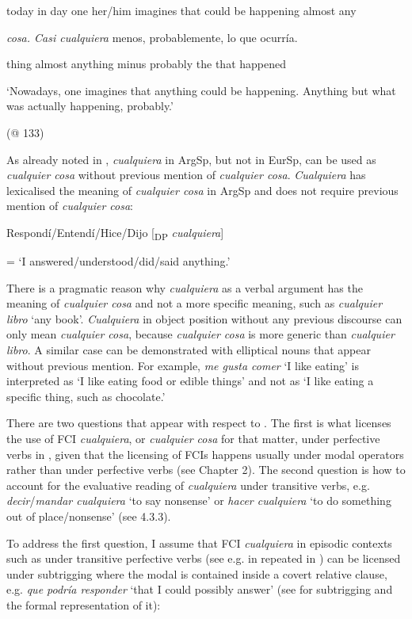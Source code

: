     today  in  day  one  her/him  imagines  that  could  be  happening  almost  any

    \textit{cosa.  Casi  cualquiera} menos,  probablemente,  lo  que  ocurría.

    thing  almost  anything  minus  probably  the  that  happened

    ‘Nowadays, one imagines that anything could be happening. Anything but what was actually happening, probably.’

    (@ 133)

As already noted in , \textit{cualquiera} in ArgSp, but not in EurSp, can be used as \textit{cualquier cosa} without previous mention of \textit{cualquier cosa}. \textit{Cualquiera} has lexicalised the meaning of \textit{cualquier cosa} in ArgSp and does not require previous mention of \textit{cualquier cosa}:

\label{bkm:Ref150786811}    Respondí/Entendí/Hice/Dijo [\textsubscript{DP} \textit{cualquiera}] 

    = ‘I answered/understood/did/said anything.’

There is a pragmatic reason why \textit{cualquiera} as a verbal argument has the meaning of \textit{cualquier cosa} and not a more specific meaning, such as \textit{cualquier libro} ‘any book’. \textit{Cualquiera} in object position without any previous discourse can only mean \textit{cualquier cosa}, because \textit{cualquier cosa} is more generic than \textit{cualquier libro}. A similar case can be demonstrated with elliptical nouns that appear without previous mention. For example, \textit{me gusta comer} ‘I like eating’ is interpreted as ‘I like eating food or edible things’ and not as ‘I like eating a specific thing, such as chocolate.’

  There are two questions that appear with respect to . The first is what licenses the use of FCI \textit{cualquiera}, or \textit{cualquier cosa} for that matter, under perfective verbs in , given that the licensing of FCIs happens usually under modal operators rather than under perfective verbs (see Chapter 2). The second question is how to account for the evaluative reading of \textit{cualquiera} under transitive verbs, e.g. \textit{decir}/\textit{mandar cualquiera} ‘to say nonsense’ or \textit{hacer cualquiera} ‘to do something out of place/nonsense’ (see 4.3.3).

  To address the first question, I assume that FCI \textit{cualquiera} in episodic contexts such as under transitive perfective verbs (see e.g.  in  repeated in ) can be licensed under subtrigging where the modal is contained inside a covert relative clause, e.g. \textit{que podría responder} ‘that I could possibly answer’ (see  for subtrigging and the formal representation of it):

